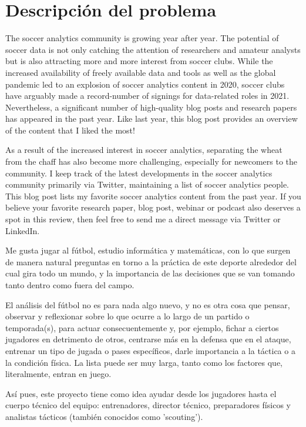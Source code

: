 \chapter{Descripción del problema}

The soccer analytics community is growing year after year. The potential of soccer data is not only catching the attention of researchers and amateur analysts but is also attracting more and more interest from soccer clubs. While the increased availability of freely available data and tools as well as the global pandemic led to an explosion of soccer analytics content in 2020, soccer clubs have arguably made a record-number of signings for data-related roles in 2021. Nevertheless, a significant number of high-quality blog posts and research papers has appeared in the past year. Like last year, this blog post provides an overview of the content that I liked the most!

As a result of the increased interest in soccer analytics, separating the wheat from the chaff has also become more challenging, especially for newcomers to the community. I keep track of the latest developments in the soccer analytics community primarily via Twitter, maintaining a list of soccer analytics people. This blog post lists my favorite soccer analytics content from the past year. If you believe your favorite research paper, blog post, webinar or podcast also deserves a spot in this review, then feel free to send me a direct message via Twitter or LinkedIn.

Me gusta jugar al fútbol, estudio informática y matemáticas, con lo que 
surgen de manera natural preguntas en torno a la práctica de este deporte 
alrededor del cual gira todo un mundo, y la importancia de las decisiones 
que se van tomando tanto dentro como fuera del campo.

El análisis del fútbol no es para nada algo nuevo, y no es otra cosa que 
pensar, observar y reflexionar sobre lo que ocurre a lo largo de un partido 
o temporada(s), para actuar consecuentemente y, por ejemplo, fichar a 
ciertos jugadores en detrimento de otros, centrarse más en la defensa 
que en el ataque, entrenar un tipo de jugada o pases específicos, darle 
importancia a la táctica o a la condición física. La lista puede ser muy 
larga, tanto como los factores que, literalmente, entran en juego.

Así pues, este proyecto tiene como idea ayudar desde los jugadores hasta 
el cuerpo técnico del equipo: entrenadores, director técnico, preparadores 
físicos y analistas tácticos (también conocidos como 'scouting').

